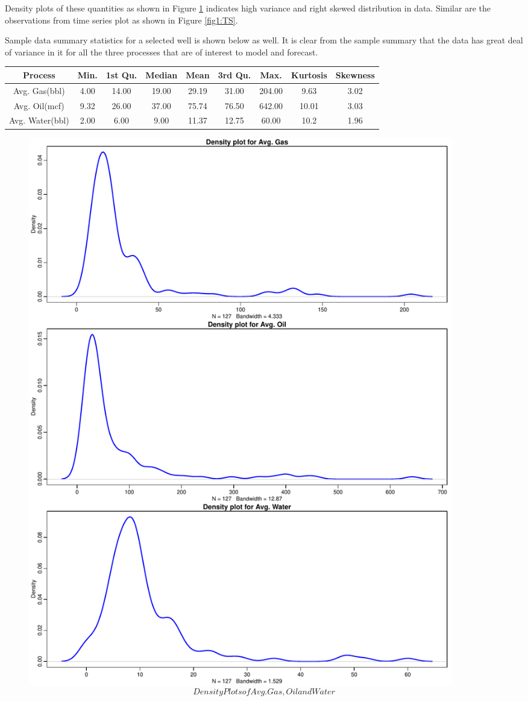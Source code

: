 \documentclass[a4paper]{article}
\begin{document}
 Density plots of these quantities as shown in Figure \ref{fig1:DensityTS} indicates high variance and right skewed distribution in data. Similar are the observations from time series plot as shown in Figure \ref{fig1:TS}. 
 
 Sample data summary statistics for a selected well is shown below as well. It is clear from the sample summary that the data has great deal of variance in it for all the three processes that are of interest to model and forecast. 
 
 \begin{center}
 	\begin{tabular}{||c c c c c c c c c ||} 
 		\hline
 		Process & Min. & 1st Qu. & Median & Mean & 3rd Qu. & Max. & Kurtosis & Skewness \\ [0.5ex] 
 		\hline\hline
 		Avg. Gas(bbl)  &  4.00   &  14.00   &  19.00  &   29.19  &  31.00   & 204.00 & 9.63 & 3.02   \\ 
 		\hline
 		Avg. Oil(mcf) &  9.32   &  26.00   &  37.00   &  75.74    & 76.50  &  642.00  & 10.01  & 3.03 \\
 		\hline
 		Avg. Water(bbl)  & 2.00    &   6.00    &   9.00   &   11.37    &  12.75   &   60.00   & 10.2  &  1.96  \\
 		\hline
 		
 		
 	\end{tabular}
 \end{center}

 \begin{figure}
 	\centering
 	\includegraphics[width=0.9\textwidth]{DensityTS}
 	\caption{$$Density Plots of Avg. Gas , Oil and Water$$}
 	\label{fig1:DensityTS}
 \end{figure}
\end{document}
